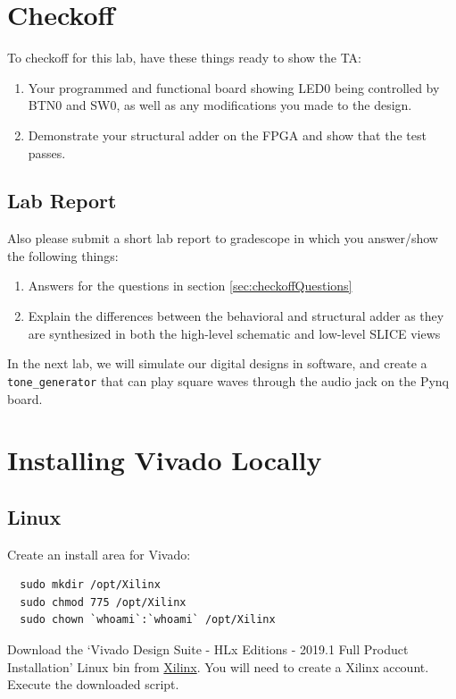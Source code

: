\documentclass[11pt]{article}
\begin{document}
\section{Checkoff}
To checkoff for this lab, have these things ready to show the TA:
\begin{enumerate}
  \item Your programmed and functional board showing LED0 being controlled by BTN0 and SW0, as well as any modifications you made to the design.
  \item Demonstrate your structural adder on the FPGA and show that the test passes.
\end{enumerate}

\subsection{Lab Report}\label{sec:labreport}
Also please submit a short lab report to gradescope in which you answer/show the following things:
\begin{enumerate}
  \item Answers for the questions in section \ref{sec:checkoffQuestions}
  \item Explain the differences between the behavioral and structural adder as they are synthesized in both the high-level schematic and low-level SLICE views
\end{enumerate}

In the next lab, we will simulate our digital designs in software, and create a \verb|tone_generator| that can play square waves through the audio jack on the Pynq board.

\appendix
\section{Installing Vivado Locally}
\subsection{Linux}
Create an install area for Vivado:
\begin{verbatim}
  sudo mkdir /opt/Xilinx
  sudo chmod 775 /opt/Xilinx
  sudo chown `whoami`:`whoami` /opt/Xilinx
\end{verbatim}

Download the `Vivado Design Suite - HLx Editions - 2019.1  Full Product Installation' Linux bin from \href{https://www.xilinx.com/support/download.html}{Xilinx}.
You will need to create a Xilinx account.
Execute the downloaded script.
\end{document}
